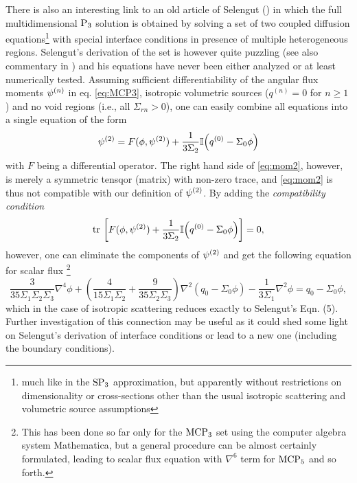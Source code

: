 There is also an interesting link to an old article of Selengut (\cite{Selengut}) in which the full multidimensional
$\PN[3]$ solution is obtained by solving a set of two coupled diffusion equations\footnote{much like in the $\SPN[3]$
approximation, but apparently without restrictions on dimensionality or cross-sections other than the usual isotropic
scattering and volumetric source assumptions} with special interface conditions in presence of multiple heterogeneous
regions. Selengut's derivation of the set is however quite puzzling (see also commentary in \cite[Sec. 5.2]{McClarren2})
and his equations have never been either analyzed or at least numerically tested. Assuming sufficient differentiability
of the angular flux moments $\fmom$ in eq. \eqref{eq:MCP3}, isotropic volumetric sources ($q^{(n)} = 0$ for $n\geq 1$)
and no void regions (i.e., all $\Sigma_{rn} > 0$), one can easily combine all equations into a single equation of the
form
\begin{equation}\label{eq:mom2}
  \fmom[2] = F(\phi, \fmom[2]) + \frac{1}{3\Sigma_2}\eye\Bigl(q^{(0)} - \Sigma_0\phi\Bigr)
\end{equation}
with $F$ being a differential operator. The right hand side of \eqref{eq:mom2}, however, is merely a symmetric tensqor
(matrix) with non-zero trace, and \eqref{eq:mom2} is thus not compatible with our definition of $\fmom[2]$. By 
adding the \textit{compatibility condition} $$
  \trace\left[F(\phi, \fmom[2]) + \frac{1}{3\Sigma_2}\eye\Bigl(q^{(0)} - \Sigma_0\phi\Bigr)\right] = 0,
$$
however, one can eliminate the components of $\fmom[2]$ and get the following equation for scalar flux
\footnote{This has been done so far only for the $\MCPN[3]$ set using the computer algebra system Mathematica, but a 
general procedure can be almost certainly formulated, leading to scalar flux equation with $\nabla^6$ term for
 $\MCPN[5]$ and so forth.}
\begin{equation}\label{eq:scfl}
  \frac{3}{35\Sigma_1\Sigma_2\Sigma_3}\nabla^4\phi + \left(\frac{4}{15\Sigma_1\Sigma_2} + 
  \frac{9}{35\Sigma_2\Sigma_3}\right)\nabla^2(q_0 - \Sigma_{0}\phi) - \frac{1}{3\Sigma_1}\nabla^2\phi
	  = q_0 - \Sigma_{0}\phi,
\end{equation}
which in the case of isotropic scattering reduces exactly to Selengut's Eqn. (5). Further investigation of this 
connection may be useful as it could shed some light on Selengut's derivation of interface conditions or lead to a
 new one (including the boundary conditions).


